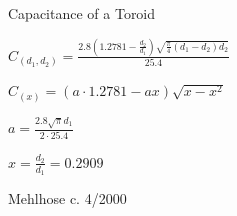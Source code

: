 \documentclass[12pt]{article}
\newcommand\ddfrac[2]{\displaystyle \frac{\displaystyle #1}{\displaystyle #2}}
\begin{document}
	\centering
	{\LARGE {Capacitance of a Toroid} } \bigbreak
	\bigbreak
	
	$ C_{(d_1, d_2)} = \ddfrac{ 2.8 \left( 1.2781 - \ddfrac{d_2}{d_1} \right) \sqrt { \ddfrac{\pi}{4} (d_1 - d_2)d_2} }{25.4} $
	\bigbreak
	\bigbreak

	$ C_{(x)} = ( a \cdot 1.2781 - ax ) \sqrt { x - x ^ 2 } $
	\break
	\break

	$ a = \ddfrac { 2.8 \sqrt {\pi} d_1 }{ 2 \cdot 25.4 } $
	\break
		
	$ x = \ddfrac{ d_2  }{ d_1 } = 0.2909 $
	\break
	
	Mehlhose c. 4/2000
	
\end{document}
